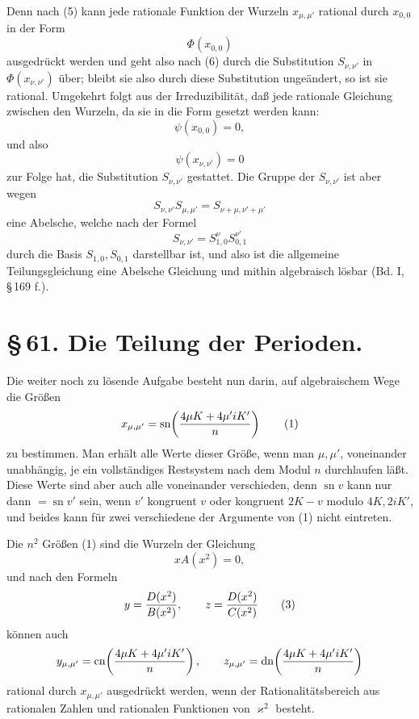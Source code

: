 \documentclass[11pt]{article}
\providecommand{\sn}{\operatorname{sn}}
\providecommand{\cn}{\operatorname{cn}}
\providecommand{\dn}{\operatorname{dn}}
\begin{document}
Denn nach (5) kann jede rationale Funktion der Wurzeln $x_{\mu,\mu'}$ rational durch
$x_{0,0}$ in der Form
\[
\Phi(x_{0,0})
\]
ausgedrückt werden und geht also nach (6) durch die Substitution $S_{\nu,\nu'}$ in
$\Phi(x_{\nu,\nu'})$ über; bleibt sie also durch diese Substitution ungeändert, so ist sie
rational. Umgekehrt folgt aus der Irreduzibilität, daß jede rationale Gleichung zwischen
den Wurzeln, da sie in die Form gesetzt werden kann:
\[
\psi(x_{0,0})=0,
\]
und also
\[
\psi(x_{\nu,\nu'})=0
\]
zur Folge hat, die Substitution $S_{\nu,\nu'}$ gestattet. Die Gruppe der $S_{\nu,\nu'}$ ist aber
wegen
\[
S_{\nu,\nu'}S_{\mu,\mu'}=S_{\nu+\mu,\nu'+\mu'}
\]
eine Abelsche, welche nach der Formel
\[
S_{\nu,\nu'}=S_{1,0}^{\nu}S_{0,1}^{\nu'}
\]
durch die Basis $S_{1,0},S_{0,1}$ darstellbar ist, und also ist die allgemeine
Teilungsgleichung eine Abelsche Gleichung und mithin algebraisch lösbar (Bd. I, \S\,169 f.).

\section*{\S\,61. Die Teilung der Perioden.}

Die weiter noch zu lösende Aufgabe besteht nun darin, auf algebraischem Wege die Größen
\begin{equation}
x_{\mu,\mu'}=\sn\!\left({4\mu K+4\mu'iK'\over n}\right)
\tag{1}
\end{equation}
zu bestimmen. Man erhält alle Werte dieser Größe, wenn man $\mu,\mu'$, voneinander
unabhängig, je ein vollständiges Restsystem nach dem Modul $n$ durchlaufen läßt. Diese
Werte sind aber auch alle voneinander verschieden, denn $\sn v$ kann nur dann $=\sn v'$
sein, wenn $v'$ kongruent $v$ oder kongruent $2K-v$ modulo $4K,2iK'$, und beides kann
für zwei verschiedene der Argumente von (1) nicht eintreten.

Die $n^2$ Größen (1) sind die Wurzeln der Gleichung
\begin{equation}
xA(x^2)=0,
\tag{2}
\end{equation}
und nach den Formeln
\begin{equation}
y={D(x^2)\over B(x^2)},\qquad z={D(x^2)\over C(x^2)}
\tag{3}
\end{equation}
können auch
\[
y_{\mu,\mu'}=\cn\!\left({4\mu K+4\mu'iK'\over n}\right),\qquad
z_{\mu,\mu'}=\dn\!\left({4\mu K+4\mu'iK'\over n}\right)
\]
rational durch $x_{\mu,\mu'}$ ausgedrückt werden, wenn der Rationalitätsbereich aus
rationalen Zahlen und rationalen Funktionen von $\varkappa^2$ besteht.
\end{document}
